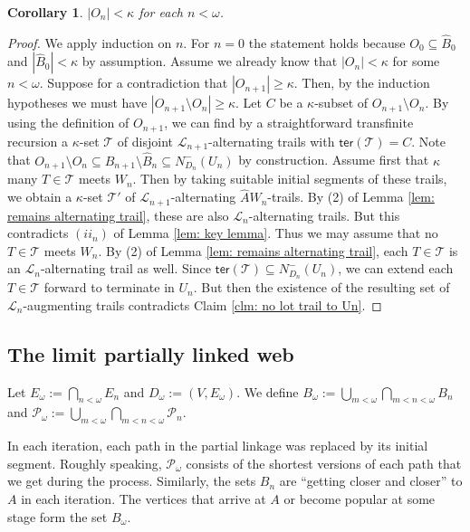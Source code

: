 \documentclass[12pt,a4paper]{amsart}
\theoremstyle{plain}
\newtheorem{corollary}[theorem]{Corollary}
\theoremstyle{definition}
\begin{document}
\begin{corollary}\label{cor: On small}
$ \left|O_n\right|<\kappa $ for each $ n<\omega $.
\end{corollary}
\begin{proof}
We apply induction on $ n $. For $ n=0 $ the statement holds because $ O_0\subseteq \widehat{B}_0 $ and $ 
\left|\widehat{B}_0\right|<\kappa $ by assumption. Assume we already know that $ \left|O_n\right|<\kappa $ for some $ 
n<\omega $.  Suppose for a 
contradiction that $ \left|O_{n+1}\right| \geq \kappa $. Then, by the induction hypotheses we must have $ 
\left|O_{n+1}\setminus O_n\right| \geq \kappa $.  Let  $ C $ be a $ \kappa  $-subset of $ O_{n+1}\setminus O_n $. By using 
the
definition of $ O_{n+1} $, we can find by a straightforward transfinite recursion a $ \kappa $-set $ \mathcal{T} $ of disjoint $ 
\mathcal{L}_{n+1} $-alternating trails with $ \mathsf{ter}(\mathcal{T})=C $. Note that $  
O_{n+1}\setminus O_n \subseteq 
\widehat{B}_{n+1}\setminus\widehat{B}_{n}\subseteq N^{-}_{D_n}(U_n)  $ by construction. Assume first that $ \kappa $ many $ 
T\in 
\mathcal{T} $ 
meets $ W_n $. Then by taking suitable initial 
segments of these trails, we obtain a $ \kappa $-set $ \mathcal{T}' $ of $ \mathcal{L}_{n+1} $-alternating 
$ \widehat{A}W_n $-trails. By (2) of Lemma \ref{lem: remains alternating trail}, these are also $ \mathcal{L}_n $-alternating 
trails. But this contradicts  $ (ii_n) $ of Lemma \ref{lem: key lemma}. Thus we may assume that no $ T\in \mathcal{T} $ 
meets $ W_n $. By (2) of Lemma \ref{lem: remains alternating trail}, each $ T\in \mathcal{T} $ is an $ \mathcal{L}_n 
$-alternating 
trail as well. Since $ \mathsf{ter}(\mathcal{T})\subseteq  N^{-}_{D_n}(U_n) $, we can extend each $ T\in \mathcal{T} $ 
forward to terminate in $ U_n $. But then the existence of the resulting set of $ \mathcal{L}_n $-augmenting trails 
contradicts Claim \ref{clm: no lot trail to Un}.
\end{proof}  


\subsection{The limit partially linked web}
Let $ 
E_\omega:=\bigcap_{n<\omega}E_n $ and $ D_\omega:=(V,E_\omega) $. We define  
$ B_\omega:=\bigcup_{m<\omega} \bigcap_{m<n<\omega} B_n $ and $ \mathcal{P}_\omega:=\bigcup_{m<\omega} 
\bigcap_{m<n<\omega} 
\mathcal{P}_n $.

 In each iteration, each path in the partial linkage was replaced 
by its initial segment. Roughly speaking,  $ 
 \mathcal{P}_\omega $  consists of the shortest versions of each path that we get during the process. Similarly, the sets $ B_n $ are ``getting closer 
 and closer'' to $ A $ in each iteration. The 
 vertices that arrive at $ A $ 
 or become popular at some stage form the set $ B_\omega $.
 
\end{document}
